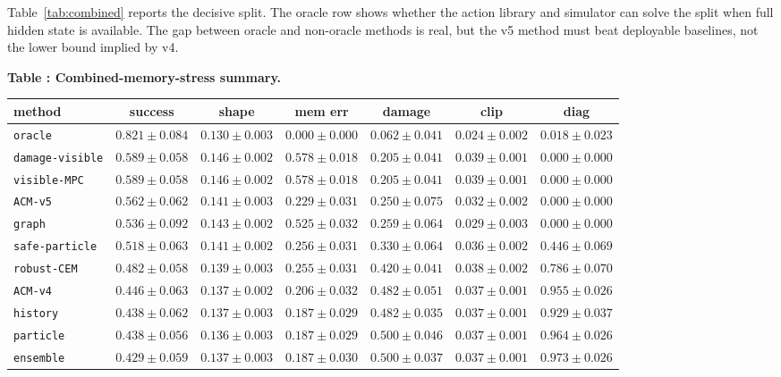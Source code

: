 \documentclass{article}
\begin{document}
Table~\ref{tab:combined} reports the decisive split. The oracle row shows whether the action library and simulator can solve the split when full hidden state is available. The gap between oracle and non-oracle methods is real, but the v5 method must beat deployable baselines, not the lower bound implied by v4.

\scriptsize
\setlength{\tabcolsep}{2pt}
\begin{center}
\label{tab:combined}\textbf{Table \thetable: Combined-memory-stress summary.}\\[0.4ex]
\begin{tabular}{lcccccc}
\toprule
method & success & shape & mem err & damage & clip & diag \\
\midrule
\texttt{oracle} & $0.821 \pm 0.084$ & $0.130 \pm 0.003$ & $0.000 \pm 0.000$ & $0.062 \pm 0.041$ & $0.024 \pm 0.002$ & $0.018 \pm 0.023$ \\
\texttt{damage-visible} & $0.589 \pm 0.058$ & $0.146 \pm 0.002$ & $0.578 \pm 0.018$ & $0.205 \pm 0.041$ & $0.039 \pm 0.001$ & $0.000 \pm 0.000$ \\
\texttt{visible-MPC} & $0.589 \pm 0.058$ & $0.146 \pm 0.002$ & $0.578 \pm 0.018$ & $0.205 \pm 0.041$ & $0.039 \pm 0.001$ & $0.000 \pm 0.000$ \\
\texttt{ACM-v5} & $0.562 \pm 0.062$ & $0.141 \pm 0.003$ & $0.229 \pm 0.031$ & $0.250 \pm 0.075$ & $0.032 \pm 0.002$ & $0.000 \pm 0.000$ \\
\texttt{graph} & $0.536 \pm 0.092$ & $0.143 \pm 0.002$ & $0.525 \pm 0.032$ & $0.259 \pm 0.064$ & $0.029 \pm 0.003$ & $0.000 \pm 0.000$ \\
\texttt{safe-particle} & $0.518 \pm 0.063$ & $0.141 \pm 0.002$ & $0.256 \pm 0.031$ & $0.330 \pm 0.064$ & $0.036 \pm 0.002$ & $0.446 \pm 0.069$ \\
\texttt{robust-CEM} & $0.482 \pm 0.058$ & $0.139 \pm 0.003$ & $0.255 \pm 0.031$ & $0.420 \pm 0.041$ & $0.038 \pm 0.002$ & $0.786 \pm 0.070$ \\
\texttt{ACM-v4} & $0.446 \pm 0.063$ & $0.137 \pm 0.002$ & $0.206 \pm 0.032$ & $0.482 \pm 0.051$ & $0.037 \pm 0.001$ & $0.955 \pm 0.026$ \\
\texttt{history} & $0.438 \pm 0.062$ & $0.137 \pm 0.003$ & $0.187 \pm 0.029$ & $0.482 \pm 0.035$ & $0.037 \pm 0.001$ & $0.929 \pm 0.037$ \\
\texttt{particle} & $0.438 \pm 0.056$ & $0.136 \pm 0.003$ & $0.187 \pm 0.029$ & $0.500 \pm 0.046$ & $0.037 \pm 0.001$ & $0.964 \pm 0.026$ \\
\texttt{ensemble} & $0.429 \pm 0.059$ & $0.137 \pm 0.003$ & $0.187 \pm 0.030$ & $0.500 \pm 0.037$ & $0.037 \pm 0.001$ & $0.973 \pm 0.026$ \\
\bottomrule
\end{tabular}
\end{center}
\normalsize
\end{document}
